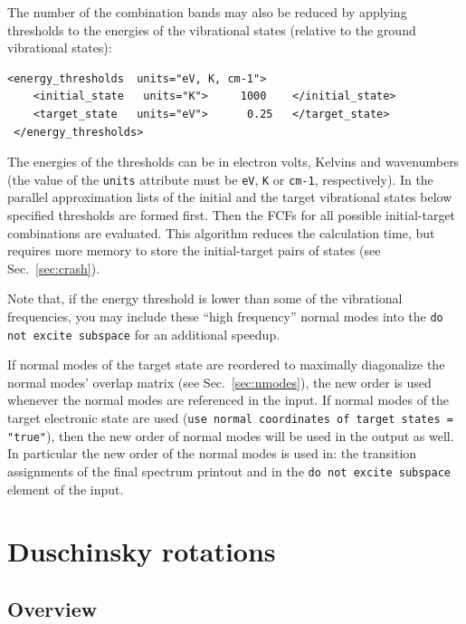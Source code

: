 \documentclass[11pt]{article}
\begin{document}
The number of the combination bands  may also be reduced by applying 
thresholds to the energies of the vibrational states 
(relative to the ground vibrational states):
\begin{lstlisting}[frame=single,framerule=0pt]
 <energy_thresholds  units="eV, K, cm-1">
    <initial_state   units="K">     1000    </initial_state>
    <target_state   units="eV">      0.25   </target_state>
 </energy_thresholds>
\end{lstlisting}
The energies of the thresholds can be in electron volts, Kelvins and wavenumbers 
(the value of the {\tt units} attribute must be {\tt eV}, {\tt K} or {\tt cm-1}, respectively).
In the parallel approximation lists of the initial and the target vibrational states below 
specified thresholds are formed first. 
Then the FCFs for all possible initial-target combinations are evaluated.
This algorithm reduces the calculation time, but requires more memory to store
the initial-target pairs of states (see Sec.~\ref{sec:crash}).

Note that, if the energy threshold is lower than some of the vibrational frequencies, 
you may include these ``high frequency'' normal modes
into the {\tt do not excite subspace} for an additional speedup.

If normal modes of the target state are reordered 
to maximally diagonalize the normal modes' overlap matrix (see Sec.~\ref{sec:nmodes}),  
the new order is used whenever the normal modes are referenced in the input.
If normal modes of the target electronic state are used ({\tt use normal coordinates of target states = "true"}),
then the new order of normal modes will be used in the output as well.
In particular the new order of the normal modes is used in:
the transition assignments of the final spectrum printout and 
in the {\tt do not excite subspace} element of the input.


\section{Duschinsky rotations}
\label{sec:dushinsky}

\subsection{Overview}
\label{sec:dhush:overview}
\end{document}
